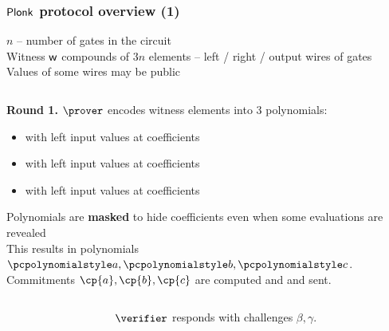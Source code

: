 \documentclass[aspectratio=169,handout]{beamer}
\renewcommand{\emph}[1]{\textbf{#1}}
\begin{document}
\begin{frame}[t]
  \frametitle{$\textnormal{\textsf{Plonk}}$ protocol overview (1)}
  \begin{block}{}
    $n$ -- number of gates in the circuit\\
    Witness $\mathsf{w}$ compounds of $3n$ elements -- left / right / output wires of
    gates\\
    Values of some wires may be public
  \end{block}
  
  \begin{columns}
    \begin{column}{0.5\linewidth}
      \textbf{Round 1.} $\prover$ encodes witness elements into $3$ polynomials:
      \begin{itemize}
      \item {} with left input values at coefficients
      \item {} with left input values at coefficients
      \item {} with left input values at coefficients
      \end{itemize}
      Polynomials are \emph{masked} to hide coefficients even when some
      evaluations are revealed\\
      This results in polynomials $\p{a}, \p{b}, \p{c}$. \\
      Commitments $\cp{a}, \cp{b}, \cp{c}$ are computed and and sent.
  \end{column}
    \begin{column}{0.5\linewidth}
    \end{column}
  \end{columns}
  \begin{columns}
    \begin{column}{0.5\linewidth}
    \end{column}
    \begin{column}{0.5\linewidth}
      $\verifier$ responds with challenges $\beta, \gamma$.
    \end{column}
  \end{columns}
\end{frame}
\end{document}
